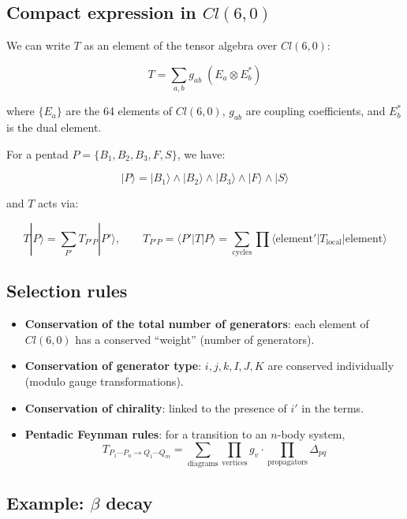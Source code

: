 \documentclass[11pt]{article}
\providecommand{\tightlist}{%
\setlength{\itemsep}{2pt}\setlength{\parskip}{6pt}
}
\begin{document}
\hypertarget{compact-expression-in-cl60}{%
\subsection{\texorpdfstring{Compact expression in
\(Cl(6,0)\)}{Compact expression in Cl(6,0)}}\label{compact-expression-in-cl60}}

We can write \(T\) as an element of the tensor algebra over \(Cl(6,0)\):

\[
T = \sum_{a,b} g_{ab} \; (E_a \otimes E_b^*)
\]

where \(\{E_a\}\) are the 64 elements of \(Cl(6,0)\), \(g_{ab}\) are
coupling coefficients, and \(E_b^*\) is the dual element.

For a pentad \(P = \{B_1,B_2,B_3,F,S\}\), we have:

\[
|P\rangle = |B_1\rangle \wedge |B_2\rangle \wedge |B_3\rangle \wedge |F\rangle \wedge |S\rangle
\]

and \(T\) acts via:

\[
T|P\rangle = \sum_{P'} T_{P'P} |P'\rangle,\qquad
T_{P'P} = \langle P'|T|P\rangle = \sum_{\text{cycles}} \prod \langle \text{element}'| T_{\text{local}}|\text{element}\rangle
\]

\hypertarget{selection-rules}{%
\subsection{Selection rules}\label{selection-rules}}

\begin{itemize}
\tightlist
\item
  \textbf{Conservation of the total number of generators}: each element
  of \(Cl(6,0)\) has a conserved ``weight'' (number of generators).
\item
  \textbf{Conservation of generator type}: \(i,j,k,I,J,K\) are conserved
  individually (modulo gauge transformations).
\item
  \textbf{Conservation of chirality}: linked to the presence of \(i'\)
  in the terms.
\item
  \textbf{Pentadic Feynman rules}: for a transition to an \(n\)-body
  system, \[
  T_{P_1\cdots P_n \to Q_1\cdots Q_m} = \sum_{\text{diagrams}} \prod_{\text{vertices}} g_v \cdot \prod_{\text{propagators}} \Delta_{pq}
  \]
\end{itemize}

\hypertarget{example-beta-decay}{%
\subsection{\texorpdfstring{Example: \(\beta\)
decay}{Example: \textbackslash beta decay}}\label{example-beta-decay}}
\end{document}
